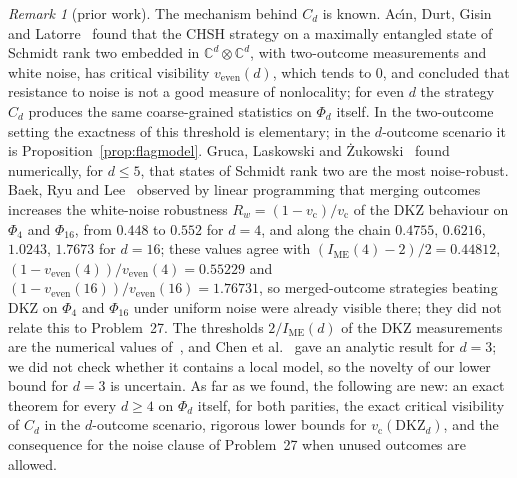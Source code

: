 \documentclass[11pt]{amsart}
\theoremstyle{definition}
\theoremstyle{remark}
\newtheorem{remark}[theorem]{Remark}
\numberwithin{equation}{section}
\newcommand{\C}{\mathbb{C}}
\newcommand{\IME}{I_{\mathrm{ME}}}
\newcommand{\vc}{v_{\mathrm c}}
\newcommand{\veven}{v_{\mathrm{even}}}
\newcommand{\DKZ}{\mathrm{DKZ}}
\begin{document}
\begin{remark}[prior work]\label{rem:literalcredit}
The mechanism behind $C_d$ is known. Ac\'{\i}n, Durt, Gisin and Latorre~\cite[eq.~(14)]{ADGL} found that the CHSH
strategy on a maximally entangled state of Schmidt rank two embedded in $\C^d\otimes\C^d$, with two-outcome
measurements and white noise, has critical visibility $\veven(d)$, which tends to $0$, and concluded that resistance to
noise is not a good measure of nonlocality; for even $d$ the strategy $C_d$ produces the same coarse-grained statistics
on $\Phi_d$ itself. In the two-outcome setting the exactness of this threshold is elementary; in the $d$-outcome
scenario it is Proposition~\ref{prop:flagmodel}. Gruca, Laskowski and \.Zukowski~\cite{GLZ} found numerically, for
$d\le5$, that states of Schmidt rank two are the most noise-robust. Baek, Ryu and Lee~\cite{BRL} observed by linear
programming that merging outcomes increases the white-noise robustness $R_w=(1-\vc)/\vc$ of the DKZ behaviour on
$\Phi_4$ and $\Phi_{16}$, from $0.448$ to $0.552$ for $d=4$, and along the chain $0.4755$, $0.6216$, $1.0243$, $1.7673$
for $d=16$; these values agree with $(\IME(4)-2)/2=0.44812$, $(1-\veven(4))/\veven(4)=0.55229$ and
$(1-\veven(16))/\veven(16)=1.76731$, so merged-outcome strategies beating DKZ on $\Phi_4$ and $\Phi_{16}$ under uniform
noise were already visible there; they did not relate this to Problem~27. The thresholds $2/\IME(d)$ of the DKZ
measurements are the numerical values of~\cite{KGZMZ,DKZ,CGLMP,GLZ}, and Chen et al.~\cite{Chen01} gave an analytic
result for $d=3$; we did not check whether it contains a local model, so the novelty of our lower bound for $d=3$ is
uncertain. As far as we found, the following are new: an exact theorem for every $d\ge4$ on $\Phi_d$ itself, for both
parities, the exact critical visibility of $C_d$ in the $d$-outcome scenario, rigorous lower bounds for
$\vc(\DKZ_d)$, and the consequence for the noise clause of Problem~27 when unused outcomes are allowed.
\end{remark}
\end{document}
